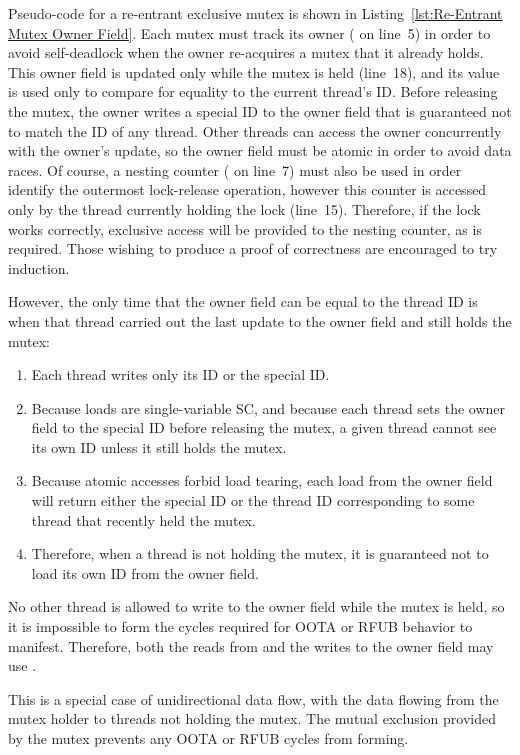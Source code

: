 \documentclass[10]{article}
\begin{document}
Pseudo-code for a re-entrant exclusive mutex is shown in
Listing~\ref{lst:Re-Entrant Mutex Owner Field}.
Each mutex must track its owner ( on line~5) in order to avoid
self-deadlock when the owner re-acquires a mutex that it already holds.
This owner field is updated only while the mutex is held (line~18), and
its value is used only to compare for equality to the current thread's ID.
Before releasing the mutex, the owner writes a special ID to the owner
field that is guaranteed not to match the ID of any thread.
Other threads can access the owner concurrently with the owner's
update, so the owner field must be atomic in order to avoid data races.
Of course, a nesting counter ( on line~7) must also be used
in order identify the outermost lock-release operation, however this
counter is accessed only by the thread currently holding the lock
(line~15).
Therefore, if the lock works correctly, exclusive access will be provided
to the nesting counter, as is required.
Those wishing to produce a proof of correctness are encouraged to try
induction.

However, the only time that the owner field can be equal to the thread ID
is when that thread carried out the last update to the owner field and
still holds the mutex:

\begin{enumerate}
\item	Each thread writes only its ID or the special ID.
\item	Because  loads are single-variable
	SC, and because each thread sets the owner field to the special
	ID before releasing the mutex, a given thread cannot see its own
	ID unless it still holds the mutex.
\item	Because atomic accesses forbid load tearing, each load from
	the owner field will return either the special ID or the thread
	ID corresponding to some thread that recently held the mutex.
\item	Therefore, when a thread is not holding the mutex, it is guaranteed
	not to load its own ID from the owner field.
\end{enumerate}

No other thread is allowed to write to the owner field while the mutex
is held, so it is impossible to form the cycles required for OOTA or
RFUB behavior to manifest.
Therefore, both the reads from and the writes to the owner field
may use .

This is a special case of unidirectional data flow, with the data flowing
from the mutex holder to threads not holding the mutex.
The mutual exclusion provided by the mutex prevents any OOTA or RFUB
cycles from forming.
\end{document}
